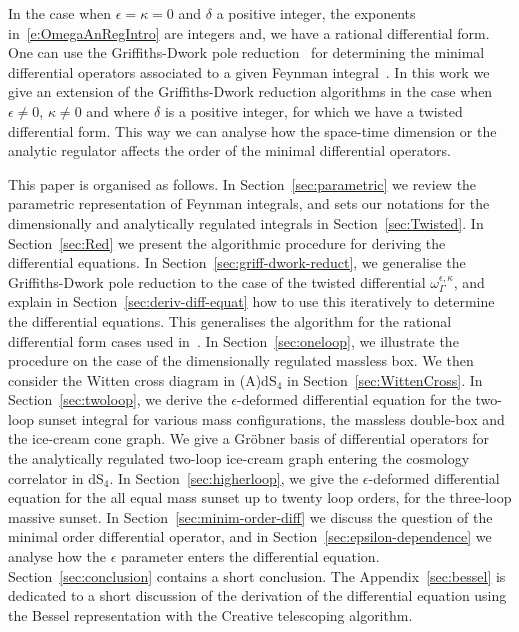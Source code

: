 \documentclass[a4paper,12pt]{article}
\numberwithin{equation}{section}
\numberwithin{figure}{section}
\begin{document}
In the case when $\epsilon=\kappa=0$ and $\delta$ a positive integer, the exponents
in~\eqref{e:OmegaAnRegIntro} are
integers and,
we have a rational differential form. One can use the  Griffiths-Dwork
pole reduction~\cite{Griffiths_1969,Griffith1,Griffith2,Dwork_1962,Dwork_1964} for determining the minimal differential operators associated to a given Feynman
integral~\cite{Bloch:2016izu,Vanhove:2018mto,Lairez:2022zkj}.
In this work we give an extension of the Griffiths-Dwork reduction  algorithms in the case when
$\epsilon\neq0$, $\kappa\neq0$ and where $\delta$ is a positive
integer, for which   we have a twisted differential
form.
%
 This way we
can analyse how the space-time dimension or the analytic regulator  affects the order of the
minimal differential operators.



This paper is organised as follows. 
In Section~\ref{sec:parametric} we review the parametric
representation of Feynman integrals, and sets our notations for the 
dimensionally and analytically regulated integrals in Section~\ref{sec:Twisted}.
In Section~\ref{sec:Red} we
present the algorithmic procedure for deriving the differential
equations. In Section~\ref{sec:griff-dwork-reduct},  we generalise the
Griffiths-Dwork pole reduction to the case of the twisted differential
$\omega_\Gamma^{\epsilon,\kappa}$, and explain in
Section~\ref{sec:deriv-diff-equat} how to use this iteratively to
determine the differential equations. This generalises the algorithm  for the rational differential form cases
used in~\cite{Lairez:2022zkj}. In Section~\ref{sec:oneloop}, we
illustrate the procedure on the case of the dimensionally regulated massless box.
We then consider the Witten cross diagram in (A)dS$_4$ in Section~\ref{sec:WittenCross}.
In
Section~\ref{sec:twoloop}, we derive the $\epsilon$-deformed
differential equation for the two-loop sunset integral for various
mass configurations, the massless double-box and the ice-cream cone
graph. We give a Gr\"obner basis of differential operators for the
analytically regulated
two-loop ice-cream graph entering the cosmology correlator in dS$_4$. In Section~\ref{sec:higherloop}, we give the $\epsilon$-deformed
differential
equation for the all equal mass sunset up to twenty loop orders, for
the three-loop massive sunset.
In Section~\ref{sec:minim-order-diff}
we discuss the question of the minimal order differential operator,
and in Section~\ref{sec:epsilon-dependence} we analyse how the
$\epsilon$ parameter enters the differential
equation. Section~\ref{sec:conclusion} contains a short
conclusion. The Appendix~\ref{sec:bessel} is dedicated to a short
discussion of the derivation of the differential equation using the
Bessel representation with the Creative telescoping algorithm.
\end{document}
